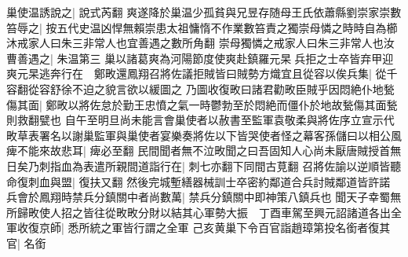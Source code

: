 巢使温誘說之|{
	說式芮翻}
爽遂降於巢温少孤貧與兄昱存随母王氏依蕭縣劉崇家崇數笞辱之|{
	按五代史温凶悍無賴崇患太祖慵惰不作業數笞責之獨崇母憐之時時自為櫛沐戒家人曰朱三非常人也宜善遇之數所角翻}
崇母獨憐之戒家人曰朱三非常人也汝曹善遇之|{
	朱温第三}
巢以諸葛爽為河陽節度使爽赴鎮羅元杲兵拒之士卒皆弃甲迎爽元杲逃奔行在　鄭畋還鳳翔召將佐議拒賊皆曰賊勢方熾宜且從容以俟兵集|{
	從千容翻從容舒徐不迫之貌言欲以緩圖之}
乃圖收復畋曰諸君勸畋臣賊乎因悶絶仆地甃傷其面|{
	鄭畋以將佐怠於勤王忠憤之氣一時鬱勃至於悶絶而僵仆於地故甃傷其面甃則救翻甓也}
自午至明旦尚未能言會巢使者以赦書至監軍袁敬柔與將佐序立宣示代畋草表署名以謝巢監軍與巢使者宴樂奏將佐以下皆哭使者怪之幕客孫儲曰以相公風痺不能來故悲耳|{
	痺必至翻}
民間聞者無不泣畋聞之曰吾固知人心尚未厭唐賊授首無日矣乃刺指血為表遣所親間道詣行在|{
	刺七亦翻下同間古莧翻}
召將佐諭以逆順皆聽命復刺血與盟|{
	復扶又翻}
然後完城塹繕器械訓士卒密約鄰道合兵討賊鄰道皆許諾兵會於鳳翔時禁兵分鎮關中者尚數萬|{
	禁兵分鎮關中即神策八鎮兵也}
聞天子幸蜀無所歸畋使人招之皆往從畋畋分財以結其心軍勢大振　丁酉車駕至興元詔諸道各出全軍收復京師|{
	悉所統之軍皆行謂之全軍}
己亥黄巢下令百官詣趙璋第投名銜者復其官|{
	名銜}


